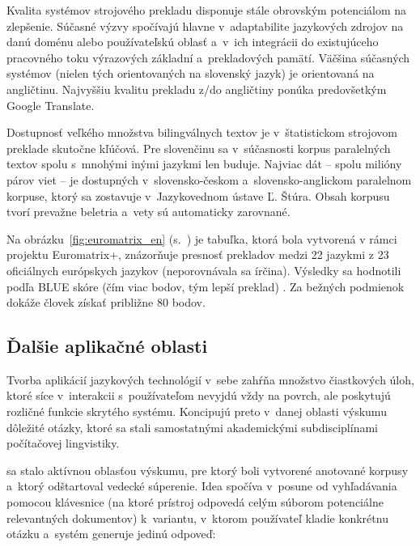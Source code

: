 \begin{multicols}{2}
Kvalita systémov strojového prekladu disponuje stále obrovským
potenciálom na zlepšenie. Súčasné výzvy spočívajú hlavne
v~adaptabilite jazykových zdrojov na danú doménu alebo
používateľskú oblasť a~v~ich integrácii do existujúceho
pracovného toku výrazových základní a~prekladových pamätí.
Väčšina súčasných systémov (nielen tých orientovaných na
slovenský jazyk) je orientovaná na angličtinu. Najvyššiu kvalitu
prekladu z/do angličtiny ponúka predovšetkým Google Translate. 


Dostupnosť veľkého množstva bilingválnych textov je v~štatistickom
strojovom preklade skutočne kľúčová. Pre slovenčinu sa
v~súčasnosti korpus paralelných textov spolu s~mnohými inými
jazykmi len buduje. Najviac dát -- spolu milióny párov viet -- je
dostupných v~slovensko-českom a~slovensko-anglickom paralelnom
korpuse, ktorý sa zostavuje v~Jazykovednom ústave Ľ. Štúra. Obsah
korpusu tvorí prevažne beletria a~vety sú automaticky zarovnané.

Na obrázku~\ref{fig:euromatrix_en} (s.~\pageref{fig:euromatrix_en}) je tabuľka, ktorá bola vytvorená v rámci projektu Euromatrix+, znázorňuje presnosť prekladov medzi 22 jazykmi z 23 oficiálnych európskych jazykov (neporovnávala sa írčina). Výsledky sa hodnotili podľa BLUE skóre (čím viac bodov, tým lepší preklad) \cite{bleu1}. Za bežných podmienok dokáže človek získať približne 80 bodov.

\subsection{Ďalšie aplikačné oblasti}
Tvorba aplikácií jazykových technológií v~sebe zahŕňa množstvo čiastkových úloh, ktoré síce v~interakcii s~používateľom nevyjdú vždy na povrch, ale poskytujú rozličné funkcie skrytého systému. Koncipujú preto v~danej oblasti výskumu dôležité otázky, ktoré sa stali samostatnými akademickými subdisciplínami počítačovej lingvistiky.

 sa stalo aktívnou oblasťou výskumu,
pre ktorý boli vytvorené anotované korpusy a~ktorý odštartoval
vedecké súperenie. Idea spočíva v~posune od vyhľadávania pomocou
klávesnice (na ktoré prístroj odpovedá celým súborom potenciálne
relevantných dokumentov) k~variantu, v~ktorom používateľ kladie
konkrétnu otázku a~systém generuje jedinú odpoveď:


\end{multicols}
